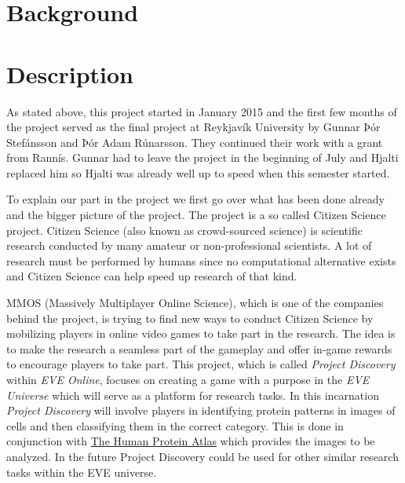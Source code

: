 \documentclass[11pt]{article}
\begin{document}
%
\date{\today}
\clearpage



\section*{Background}

\section*{Description}

As stated above, this project started in January 2015 and the first few months of the project served as the final project at Reykjavík University by Gunnar Þór Stefánsson and Þór Adam Rúnarsson. They continued their work with a grant from Rannís. Gunnar had to leave the project in the beginning of July and Hjalti replaced him so Hjalti was already well up to speed when this semester started. 
 
To explain our part in the project we first go over what has been done already and the bigger picture of the project. The project is a so called Citizen Science project. Citizen Science (also known as crowd-sourced science) is scientific research conducted by many amateur or non-professional scientists. A lot of research must be performed by humans since no computational alternative exists and Citizen Science can help speed up research of that kind. 


MMOS (Massively Multiplayer Online Science), which is one of the companies behind the project, is trying to find new ways to conduct Citizen Science by mobilizing players in online video games to take part in the research. The idea is to make the research a seamless part of the gameplay and offer in-game rewards to encourage players to take part. This project, which is called \emph{Project Discovery} within \emph{EVE Online}, focuses on creating a game with a purpose in the \emph{EVE Universe} which will serve as a platform for research tasks. In this incarnation \emph{Project Discovery} will involve players in identifying protein patterns in images of cells and then classifying them in the correct category. This is done in conjunction with \href{http://www.proteinatlas.org/subcellular}{The Human Protein Atlas} which provides the images to be analyzed. In the future Project Discovery could be used for other similar research tasks within the EVE universe.
\end{document}

